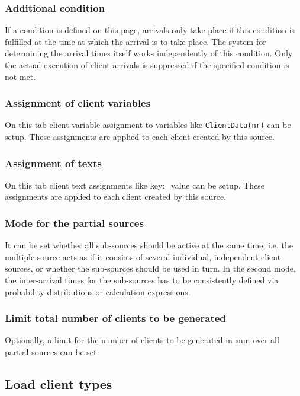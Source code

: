 \subsubsection*{Additional condition}

If a condition is defined on this page, arrivals only take place
if this condition is fulfilled at the time at which the arrival is to take place.
The system for determining the arrival times itself works independently of this condition.
Only the actual execution of client arrivals is suppressed if the specified condition is not met.

\subsubsection*{Assignment of client variables}

On this tab client variable assignment to variables like \texttt{ClientData(nr)} can be setup.
These assignments are applied to each client created by this source.

\subsubsection*{Assignment of texts}

On this tab client text assignments like key:=value can be setup.
These assignments are applied to each client created by this source.

\subsubsection*{Mode for the partial sources}

It can be set whether all sub-sources should be active at the same time, i.e. the
multiple source acts as if it consists of several individual, independent client sources,
or whether the sub-sources should be used in turn. In the second mode, the inter-arrival times
for the sub-sources has to be consistently defined via probability distributions or calculation expressions.

\subsubsection*{Limit total number of clients to be generated}

Optionally, a limit for the number of clients to be generated in sum over
all partial sources can be set.

\subsection*{Load client types}


